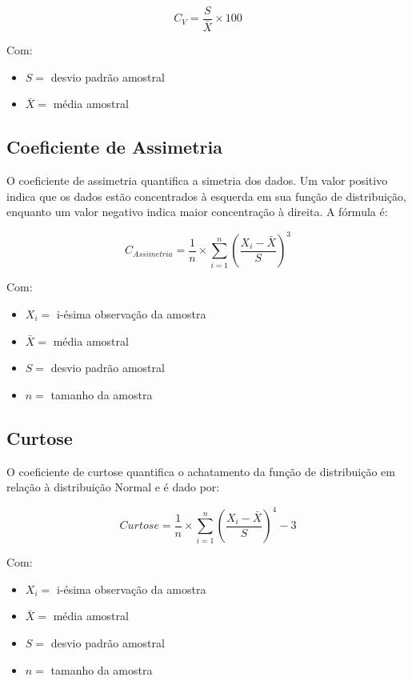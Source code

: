 \documentclass[
]{estat/estat}
\begin{document}
\[C_V=\frac{S}{\bar{X}}\times 100\]

Com:

\begin{itemize}
\item
  \(S =\) desvio padrão amostral
\item
  \(\bar{X} =\) média amostral
\end{itemize}

\subsection{Coeficiente de Assimetria}\label{coeficiente-de-assimetria}

O coeficiente de assimetria quantifica a simetria dos dados. Um valor
positivo indica que os dados estão concentrados à esquerda em sua função
de distribuição, enquanto um valor negativo indica maior concentração à
direita. A fórmula é:

\[C_{Assimetria} = \frac{1}{n}\times\sum\limits_{i=1}^{n} \left(\frac{X_i - \bar{X}}{S}\right)^3 \]

Com:

\begin{itemize}
\item
  \(X_i =\) i-ésima observação da amostra
\item
  \(\bar{X} =\) média amostral
\item
  \(S=\) desvio padrão amostral
\item
  \(n=\) tamanho da amostra
\end{itemize}

\subsection{Curtose}\label{curtose}

O coeficiente de curtose quantifica o achatamento da função de
distribuição em relação à distribuição Normal e é dado por:

\[Curtose = \frac{1}{n}\times\sum\limits_{i=1}^{n}\left(\frac{ X_i-\bar{X} }{S} \right)^4 - 3\]

Com:

\begin{itemize}
\item
  \(X_i =\) i-ésima observação da amostra
\item
  \(\bar{X} =\) média amostral
\item
  \(S =\) desvio padrão amostral
\item
  \(n =\) tamanho da amostra
\end{itemize}
\end{document}
